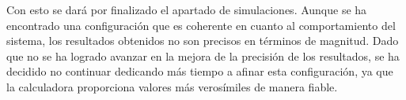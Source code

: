 Con esto se dará por finalizado el apartado de simulaciones. Aunque se ha encontrado una configuración que es coherente en cuanto al comportamiento del sistema, los resultados obtenidos no son precisos en términos de magnitud. Dado que no se ha logrado avanzar en la mejora de la precisión de los resultados, se ha decidido no continuar dedicando más tiempo a afinar esta configuración, ya que la calculadora proporciona valores más verosímiles de manera fiable.